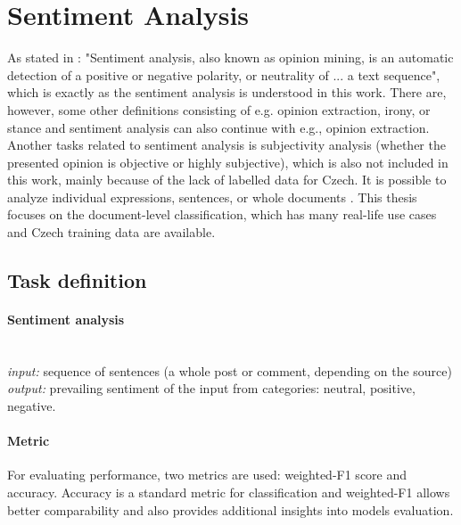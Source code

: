\section{Sentiment Analysis}
\label{chap:sent}
As stated in \citet{Veselovska}: "Sentiment analysis, also known as opinion mining, is an automatic detection of a positive or negative polarity, or neutrality of ... a text sequence", which is exactly as the sentiment analysis is understood in this work. There are, however, some other definitions consisting of e.g. opinion extraction, irony, or stance \citep{Montoyo2012} and sentiment analysis can also continue with e.g., opinion extraction. Another tasks related to sentiment analysis is subjectivity analysis (whether the presented opinion is objective or highly subjective), which is also not included in this work, mainly because of the lack of labelled data for Czech. It is possible to analyze individual expressions, sentences, or whole documents \citep{Veselovska}. This thesis focuses on the document-level classification, which has many real-life use cases and Czech training data are available.
\subsection{Task definition}
\paragraph{Sentiment analysis} \mbox{}\\
\textit{input:} sequence of sentences (a whole post or comment, depending on the source) \\
\textit{output:} prevailing sentiment of the input from categories: neutral, positive, negative.
\par

\paragraph{Metric} For evaluating performance, two metrics are used: weighted-F1 score and accuracy. Accuracy is a standard metric for classification and weighted-F1 allows better comparability and also provides additional insights into models evaluation.
